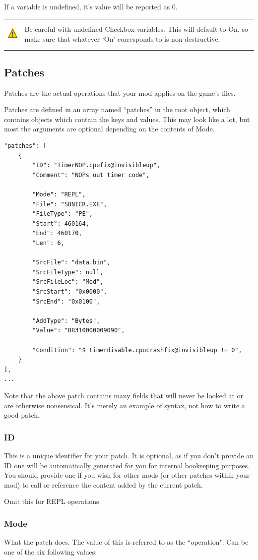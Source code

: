 \documentclass[12pt,a4paper,notitlepage]{article}
\newcommand{\warning}[1]{
    \begin{tabular}{m{1.1cm}  m{11cm}}
    &\\
    \includegraphics[width=1.1cm, height=1.1cm]{warning} & #1
    \\&\\
    \end{tabular}
}
\begin{document}
If a variable is undefined, it's value will be reported as 0.

\warning{Be careful with undefined Checkbox variables. This will default to On, so make sure that whatever `On' corresponds to is non-destructive.}

\subsection{Patches}
\label{subsec:create-patch}
Patches are the actual operations that your mod applies on the game's files.

Patches are defined in an array named ``patches'' in the root object, which contains objects which contain the keys and values. This may look like a lot, but most the arguments are optional depending on the contents of Mode.

\clearpage
\begin{lstlisting}[breaklines=true]
"patches": [
    {	
        "ID": "TimerNOP.cpufix@invisibleup",
        "Comment": "NOPs out timer code",
        
        "Mode": "REPL",
        "File": "SONICR.EXE",
        "FileType": "PE",
        "Start": 460164,
        "End": 460170,
        "Len": 6,
        
        "SrcFile": "data.bin",
        "SrcFileType": null,
        "SrcFileLoc": "Mod",
        "SrcStart": "0x0000",
        "SrcEnd": "0x0100",
        
        "AddType": "Bytes",
        "Value": "B8310000009090",
        
        "Condition": "$ timerdisable.cpucrashfix@invisibleup != 0",
    }
],
...
\end{lstlisting}
Note that the above patch contains many fields that will never be looked at or are otherwise nonsensical. It's merely an example of syntax, not how to write a good patch.

\subsubsection{ID}
This is a unique identifier for your patch. It is optional, as if you don't provide an ID one will be automatically generated for you for internal bookeeping purposes. You should provide one if you wish for other mods (or other patches within your mod) to call or reference the content added by the current patch.

Omit this for REPL operations.

\subsubsection{Mode}
What the patch does. The value of this is referred to as the ``operation". Can be one of the six following values:
\end{document}
